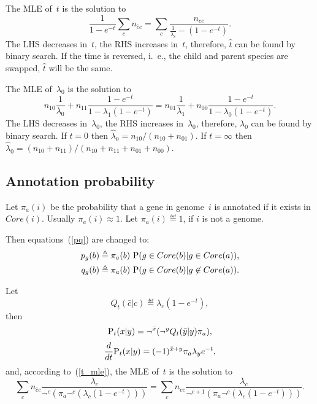 \documentclass[10pt,a4paper]{article}
\theoremstyle{plain} \newtheorem{Lem}{Lemma}
\begin{document}
The MLE of~$t$ is the solution to
$$ \frac 1 {1 - e^{-t}} \sum_c n_{\bar c c} = \sum_c \frac {n_{cc}}  {\frac 1 {\lambda_c} - (1 - e^{-t})}. $$
The LHS decreases in~$t$, the RHS increases in~$t$, therefore, $\hat t$ can be found by binary search.
If the time is reversed, i.~e., the child and parent species are swapped, $\hat t$ will be the same.

The MLE of~$\lambda_0$ is the solution to
$$   n_{10} \frac 1 {\lambda_0} + n_{11} \frac {1 - e^{-t}} {1 - \lambda_1 (1 - e^{-t})} 
   = n_{01} \frac 1 {\lambda_1} + n_{00} \frac {1 - e^{-t}} {1 - \lambda_0 (1 - e^{-t})}.
$$
The LHS decreases in~$\lambda_0$, the RHS increases in~$\lambda_0$, therefore, $\lambda_0$ can be found by binary search.
If $t=0$ then $\hat \lambda_0 = n_{10} / (n_{10} + n_{01})$.
If $t=\infty$ then $\hat \lambda_0 = (n_{10} + n_{11}) / (n_{10} + n_{11} + n_{01} + n_{00})$.



\subsection {Annotation probability}

Let $\pi_a(i)$ be the probability that a gene in genome~$i$ is annotated if it exists in $Core(i)$. 
Usually $\pi_a(i) \approx 1$.
Let $\pi_a(i) \eqdef 1$, if $i$ is not a genome.

Then equations~(\ref{pq}) are changed to:
\begin{equation*}
\begin{split}
p_g(b) &\eqdef \pi_a(b) \ \P (g \in Core(b) | g \in Core(a)), \\
q_g(b) &\eqdef \pi_a(b) \ \P (g \in Core(b) | g \not \in Core(a)). 
\end{split}
\end{equation*}


Let
$$ Q_t(\bar c|c) \eqdef \lambda_c \left(1 -  e^{-t} \right), $$
then
$$ \P_t(x|y) = \neg^{\bar x} (\neg^y Q_t(\bar y|y) \pi_a), $$
$$ \frac d {dt} \P_t(x|y) = (-1)^{\bar x + y} \pi_a \lambda_y e^{-t}, $$
and, according to~(\ref{t_mle}), the MLE of~$t$ is the solution to
$$   \sum_c n_{\bar c c} \frac {\lambda_c} {\neg^c (\pi_a \neg^c (\lambda_c (1 - e^{-t}))) }
   = \sum_c n_{c c} \frac {\lambda_c} {\neg^{c+1} (\pi_a \neg^c (\lambda_c (1 - e^{-t}))) }. $$
\end{document}
